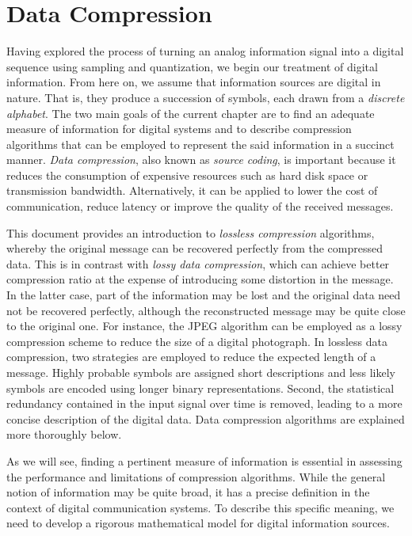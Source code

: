 \chapter{Data Compression}

Having explored the process of turning an analog information signal into a digital sequence using sampling and quantization, we begin our treatment of digital information.
From here on, we assume that information sources are digital in nature.
That is, they produce a succession of symbols, each drawn from a \emph{discrete alphabet}.
The two main goals of the current chapter are to find an adequate measure of information for digital systems and to describe compression algorithms that can be employed to represent the said information in a succinct manner.
\emph{Data compression}, also known as \emph{source coding}, is important because it reduces the consumption of expensive resources such as hard disk space or transmission bandwidth.
Alternatively, it can be applied to lower the cost of communication, reduce latency or improve the quality of the received messages.

This document provides an introduction to \emph{lossless compression} algorithms, whereby the original message can be recovered perfectly from the compressed data.
This is in contrast with \emph{lossy data compression}, which can achieve better compression ratio at the expense of introducing some distortion in the message.
In the latter case, part of the information may be lost and the original data need not be recovered perfectly, although the reconstructed message may be quite close to the original one.
For instance, the JPEG algorithm can be employed as a lossy compression scheme to reduce the size of a digital photograph.
In lossless data compression, two strategies are employed to reduce the expected length of a message.
Highly probable symbols are assigned short descriptions and less likely symbols are encoded using longer binary representations.
Second, the statistical redundancy contained in the input signal over time is removed, leading to a more concise description of the digital data.
Data compression algorithms are explained more thoroughly below.

As we will see, finding a pertinent measure of information is essential in assessing the performance and limitations of compression algorithms.
While the general notion of information may be quite broad, it has a precise definition in the context of digital communication systems.
To describe this specific meaning, we need to develop a rigorous mathematical model for digital information sources.



